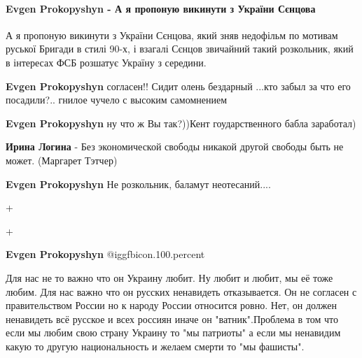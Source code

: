  
 
 
 
 
\paragraph{Evgen Prokopyshyn - А я пропоную викинути з України Сєнцова}

\begin{itemize} %

А я пропоную викинути з України Сєнцова, який зняв недофільм по мотивам руської
Бригади в стилі 90-х, і взагалі Сєнцов звичайний такий розкольник, який в
інтересах ФСБ розшатує Україну з середини.

\begin{itemize} %
\textbf{Evgen Prokopyshyn} согласен!! Сидит олень бездарный ...кто забыл за что его посадили?.. гнилое чучело с высоким самомнением

\textbf{Evgen Prokopyshyn} ну что ж Вы так?))Кент гоударственного бабла заработал)

\textbf{Ирина Логина} - Без экономической свободы никакой другой свободы быть не может. (Маргарет Тэтчер)

\textbf{Evgen Prokopyshyn} Не розкольник, баламут неотесаний....

+

+

\textbf{Evgen Prokopyshyn}  @igg{fbicon.100.percent} 
\end{itemize} %


\par

Для нас не то важно что он Украину любит. Ну любит и любит, мы её тоже любим. Для
нас важно что он русских ненавидеть отказывается. Он не согласен с
правительством России но к народу России относится ровно. Нет, он должен
ненавидеть всё русское и всех россиян иначе он "ватник".Проблема в том что если
мы любим свою страну Украину то "мы патриоты" а если мы ненавидим какую то
другую национальность и желаем смерти то "мы фашисты".


\end{itemize}
